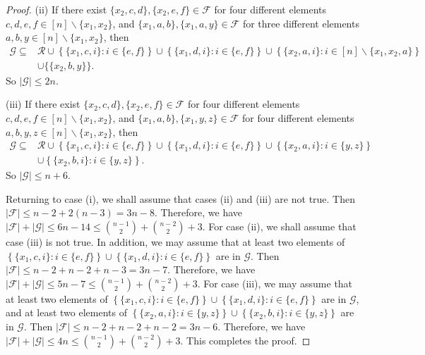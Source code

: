 \documentclass[11pt]{article}
\numberwithin{equation}{section}
\begin{document}
\begin{proof}
(ii) If there exist $\{x_2, c, d\}, \{x_2, e, f\}\in \mathcal{F}$ for four different elements $c, d, e, f\in [n]\backslash \{x_1, x_2\}$, and $\{x_1, a, b\}, \{x_1, a, y\}\in \mathcal{F}$ for three different elements $a, b, y\in [n]\backslash \{x_1, x_2\}$, then
\begin{align*}
\mathcal{G}\subseteq&\mathcal{R}\cup\left\{\{x_1,c, i\}:  i\in \{e,f\}\right\}\cup\left\{\{x_1,d, i\}:  i\in \{e,f\}\right\}\cup\left\{\{x_2,a, i\}:  i\in [n]\backslash\{x_1,x_2,a\}\right\}\\
&\cup\{\{x_2,b, y\}\}.
\end{align*}
So $|\mathcal{G}|\leq 2 n$.

(iii) If there exist $\{x_2, c, d\}, \{x_2, e, f\}\in \mathcal{F}$ for four different elements $c, d, e, f\in [n]\backslash \{x_1, x_2\}$, and $\{x_1, a, b\}, \{x_1, y, z\}\in \mathcal{F}$ for four different elements $a, b, y, z\in [n]\backslash \{x_1, x_2\}$, then
\begin{align*}
\mathcal{G}\subseteq&\mathcal{R}\cup\left\{\{x_1,c, i\}:  i\in \{e,f\}\right\}\cup\left\{\{x_1,d, i\}:  i\in \{e,f\}\right\}\cup\left\{\{x_2,a, i\}:  i\in \{y,z\}\right\}\\
&\cup\left\{\{x_2,b, i\}:  i\in \{y,z\}\right\}.
\end{align*}
So $|\mathcal{G}|\leq n+6$.


Returning to case (i), we shall assume that cases (ii) and (iii) are not true. Then  $|\mathcal{F}|\leq n-2+2(n-3)=3n-8$. Therefore, we have
$|\mathcal{F}|+|\mathcal{G}|\leq 6n-14\leq\binom{n-1}{2}+\binom{n-2}{2}+3$.
For case (ii), we shall assume that case (iii) is not true. In addition, we may assume that at least two elements of $\left\{\{x_1,c, i\}:  i\in \{e,f\}\right\}\cup\left\{\{x_1,d, i\}:  i\in \{e,f\}\right\}$ are in $\mathcal{G}$.
Then  $|\mathcal{F}|\leq n-2+n-2+n-3=3n-7$. Therefore, we have
$|\mathcal{F}|+|\mathcal{G}|\leq 5n-7\leq\binom{n-1}{2}+\binom{n-2}{2}+3$.
For case (iii), we may assume that at least two elements of $\left\{\{x_1,c, i\}:  i\in \{e,f\}\right\}\cup\left\{\{x_1,d, i\}:  i\in \{e,f\}\right\}$ are in $\mathcal{G}$, and at least two elements of $\left\{\{x_2,a, i\}:  i\in \{y,z\}\right\}\cup\left\{\{x_2,b, i\}:  i\in \{y,z\}\right\}$ are in $\mathcal{G}$.  Then  $|\mathcal{F}|\leq n-2+n-2+n-2=3n-6$. Therefore, we have
$|\mathcal{F}|+|\mathcal{G}|\leq 4n\leq\binom{n-1}{2}+\binom{n-2}{2}+3$.
This completes the proof.
\end{proof}
\end{document}
